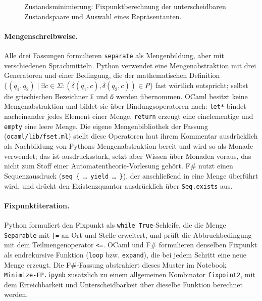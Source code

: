 \begin{figure}[tbp]



\caption{Zustandsminimierung: Fixpunktberechnung der unterscheidbaren Zustandspaare und Auswahl eines Repräsentanten.}
\label{fig:minimize_separable}
\end{figure}

\paragraph{Mengenschreibweise.}
Alle drei Fassungen formulieren \texttt{separate} als Mengenbildung, aber mit verschiedenen Sprachmitteln.
Python verwendet eine Mengenabstraktion mit drei Generatoren und einer Bedingung, die der mathematischen Definition $\{(q_1, q_2) \mid \exists c \in \Sigma : (\delta(q_1, c), \delta(q_2, c)) \in P\}$ fast wörtlich entspricht; selbst die griechischen Bezeichner \texttt{Σ} und \texttt{𝛿} werden übernommen.
OCaml besitzt keine Mengenabstraktion und bildet sie über Bindungsoperatoren nach: \texttt{let*} bindet nacheinander jedes Element einer Menge, \texttt{return} erzeugt eine einelementige und \texttt{empty} eine leere Menge.
Die eigene Mengenbibliothek der Fassung (\texttt{ocaml/lib/fset.ml}) stellt diese Operatoren laut ihrem Kommentar ausdrücklich als Nachbildung von Pythons Mengenabstraktion bereit und wird so als Monade verwendet; das ist ausdrucksstark, setzt aber Wissen über Monaden voraus, das nicht zum Stoff einer Automatentheorie-Vorlesung gehört.
F\# nutzt einen Sequenzausdruck (\texttt{seq \{ \dots{} yield \dots{} \}}), der anschließend in eine Menge überführt wird, und drückt den Existenzquantor ausdrücklich über \texttt{Seq.exists} aus.

\paragraph{Fixpunktiteration.}
Python formuliert den Fixpunkt als \texttt{while True}-Schleife, die die Menge \texttt{Separable} mit \texttt{|=} an Ort und Stelle erweitert, und prüft die Abbruchbedingung mit dem Teilmengenoperator \texttt{<=}.
OCaml und F\# formulieren denselben Fixpunkt als endrekursive Funktion (\texttt{loop} bzw. \texttt{expand}), die bei jedem Schritt eine neue Menge erzeugt.
Die F\#-Fassung abstrahiert dieses Muster im Notebook \texttt{Minimize-FP.ipynb} zusätzlich zu einem allgemeinen Kombinator \texttt{fixpoint2}, mit dem Erreichbarkeit und Unterscheidbarkeit über dieselbe Funktion berechnet werden.

